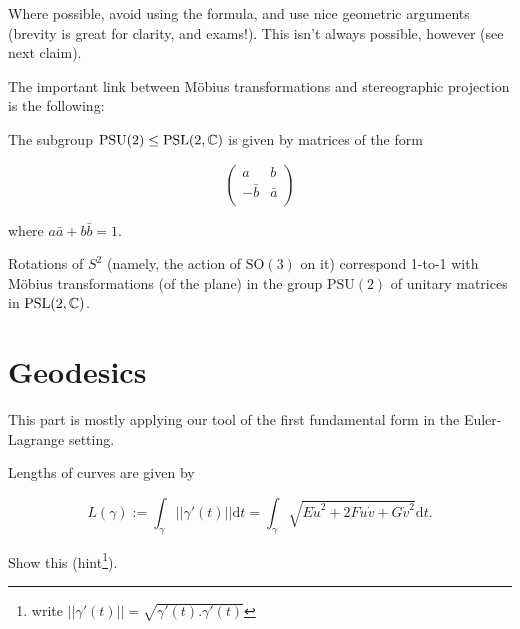 \documentclass[11pt]{scrartcl}
\begin{document}
\begin{remark}
Where possible, avoid using the formula, and use nice geometric arguments (brevity is great for clarity, and exams!). This isn't always possible, however (see next claim).
\end{remark}

The important link between M{\"o}bius transformations and stereographic projection is the following:

\begin{definition}
The subgroup $\text{PSU}(2) \le \text{PSL}(2,\mathbb C)$ is given by matrices of the form

\begin{equation}
    \begin{pmatrix}
    a & b \\
    -\bar{b} & \bar{a} \\
    \end{pmatrix}
\end{equation}

where $a\bar{a} + b\bar{b} = 1$.
\end{definition}


\begin{proposition}
Rotations of $S^2$ (namely, the action of $\text{SO}(3)$ on it) correspond 1-to-1 with M{\"o}bius transformations (of the plane) in the group $\text{PSU}(2)$ of unitary matrices in $\text{PSL}(2, \mathbb C)$.
\end{proposition}

\section{Geodesics}

This part is mostly applying our tool of the first fundamental form in the Euler-Lagrange setting.

\begin{proposition}

Lengths of curves are given by

\begin{equation}
L(\gamma) := \int_\gamma ||\gamma'(t)|| \mathrm{d}t = \int_\gamma \sqrt{E\dot{u}^2 + 2F\dot{u}\dot{v} + G\dot{v}^2} \mathrm{d}t.
\end{equation}
\end{proposition}

\begin{exercise}
Show this (hint\footnote{write $||\gamma'(t)|| = \sqrt{\gamma'(t) . \gamma'(t)}$}).
\end{exercise}
\end{document}
